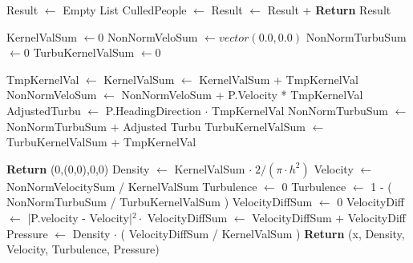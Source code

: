 \begin{center}
\label{alg:revised_algorithm}
\begin{algorithmic}[1]

\label{firstfunc}
\State Result $\gets$ Empty List 
    \State CulledPeople $\gets$  
    \State Result $\gets$ Result + 
\EndFor
\State \textbf{Return} Result

\EndFunction

\label{secondfunc}


\State KernelValSum $\gets 0$\label{firstval}
\State NonNormVeloSum $\gets vector(0.0,0.0)$\label{veloval}
\State NonNormTurbuSum $\gets 0$
\State TurbuKernelValSum $\gets 0$\label{lastval}


    \State TmpKernelVal $\gets$ \label{tmpkernel}
    \State KernelValSum $\gets$ KernelValSum + TmpKernelVal
    \State NonNormVeloSum $\gets$ NonNormVeloSum + P.Velocity * TmpKernelVal
    \label{validhead}
        \State AdjustedTurbu $\gets$ P.HeadingDirection $\cdot$ TmpKernelVal\label{adjustturbu}
        \State NonNormTurbuSum $\gets$ NonNormTurbuSum $+$ Adjusted Turbu \label{turbusum}
        \State TurbuKernelValSum $\gets$ TurbuKernelValSum + TmpKernelVal\label{turbukernel}
    \EndIf
\EndFor

\label{nullcheck}
    \State \textbf{Return} (0,(0,0),0,0)
\Else
    \State Density $\gets$ KernelValSum $\cdot \; 2 / (\pi \cdot h^2)$\label{firstres}
    \State Velocity $\gets$ NonNormVelocitySum / KernelValSum \label{secondres}
    \State Turbulence $\gets$ 0
     \label{turbunullcheck}
        \State Turbulence $\gets$ 1 - ( NonNormTurbuSum / TurbuKernelValSum )\label{thirdres}
    \EndIf
    \State VelocityDiffSum $\gets$ 0 \label{firstpres}
        \State VelocityDiff $\gets$ |P.velocity - Velocity|$^2 \cdot$ \label{secondkernel}
        \State VelocityDiffSum $\gets$ VelocityDiffSum $+$ VelocityDiff
    \EndFor
    \State Pressure $\gets$ Density $\cdot$ ( VelocityDiffSum / KernelValSum )\label{lastpres}
\State \textbf{Return} (x, Density, Velocity, Turbulence, Pressure)\label{return}
\EndIf
\EndFunction
\end{algorithmic}
\end{center}






